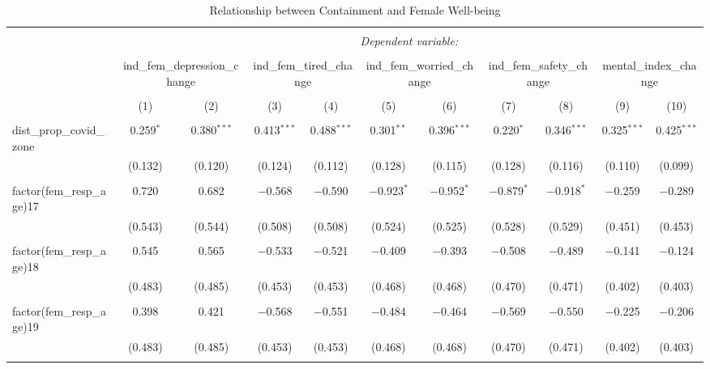 
\begin{table}[!htbp] \centering 
  \caption{Relationship between Containment and Female Well-being} 
  \label{} 
\begin{tabular}{@{\extracolsep{5pt}}lcccccccccc} 
\\[-1.8ex]\hline 
\hline \\[-1.8ex] 
 & \multicolumn{10}{c}{\textit{Dependent variable:}} \\ 
\cline{2-11} 
\\[-1.8ex] & \multicolumn{2}{c}{ind\_fem\_depression\_change} & \multicolumn{2}{c}{ind\_fem\_tired\_change} & \multicolumn{2}{c}{ind\_fem\_worried\_change} & \multicolumn{2}{c}{ind\_fem\_safety\_change} & \multicolumn{2}{c}{mental\_index\_change} \\ 
\\[-1.8ex] & (1) & (2) & (3) & (4) & (5) & (6) & (7) & (8) & (9) & (10)\\ 
\hline \\[-1.8ex] 
 dist\_prop\_covid\_zone & 0.259$^{*}$ & 0.380$^{***}$ & 0.413$^{***}$ & 0.488$^{***}$ & 0.301$^{**}$ & 0.396$^{***}$ & 0.220$^{*}$ & 0.346$^{***}$ & 0.325$^{***}$ & 0.425$^{***}$ \\ 
  & (0.132) & (0.120) & (0.124) & (0.112) & (0.128) & (0.115) & (0.128) & (0.116) & (0.110) & (0.099) \\ 
  & & & & & & & & & & \\ 
 factor(fem\_resp\_age)17 & 0.720 & 0.682 & $-$0.568 & $-$0.590 & $-$0.923$^{*}$ & $-$0.952$^{*}$ & $-$0.879$^{*}$ & $-$0.918$^{*}$ & $-$0.259 & $-$0.289 \\ 
  & (0.543) & (0.544) & (0.508) & (0.508) & (0.524) & (0.525) & (0.528) & (0.529) & (0.451) & (0.453) \\ 
  & & & & & & & & & & \\ 
 factor(fem\_resp\_age)18 & 0.545 & 0.565 & $-$0.533 & $-$0.521 & $-$0.409 & $-$0.393 & $-$0.508 & $-$0.489 & $-$0.141 & $-$0.124 \\ 
  & (0.483) & (0.485) & (0.453) & (0.453) & (0.468) & (0.468) & (0.470) & (0.471) & (0.402) & (0.403) \\ 
  & & & & & & & & & & \\ 
 factor(fem\_resp\_age)19 & 0.398 & 0.421 & $-$0.568 & $-$0.551 & $-$0.484 & $-$0.464 & $-$0.569 & $-$0.550 & $-$0.225 & $-$0.206 \\ 
  & (0.483) & (0.485) & (0.453) & (0.453) & (0.468) & (0.468) & (0.470) & (0.471) & (0.402) & (0.403) \\ 
  & & & & & & & & & & \\ 

\end{tabular}
\end{table}
